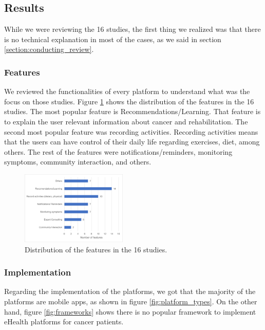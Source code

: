 \documentclass[conference]{IEEEtran}
\begin{document}
\subsection{Results}

While we were reviewing the 16 studies, the first thing we realized was that there is no technical explanation in most of the cases, as we said in section \ref{section:conducting_review}.

\subsubsection{Features}

We reviewed the functionalities of every platform to understand what was the focus on those studies. Figure \ref{fig:features_chart} shows the distribution of the features in the 16 studies. The most popular feature is Recommendations/Learning. That feature is to explain the user relevant information about cancer and rehabilitation. The second most popular feature was recording activities. Recording activities means that the users can have control of their daily life regarding exercises, diet, among others. The rest of the features were notifications/reminders, monitoring symptoms, community interaction, and others.

\begin{figure}[h]
    \centering
    \includegraphics[width=0.45\textwidth]{charts/Features.png}
    \caption{Distribution of the features in the 16 studies.}
    \label{fig:features_chart}
\end{figure}

\subsubsection{Implementation}

Regarding the implementation of the platforms, we got that the majority of the platforms are mobile apps, as shown in figure \ref{fig:platform_types}. On the other hand, figure \ref{fig:frameworks} shows there is no popular framework to implement eHealth platforms for cancer patients.
\end{document}
